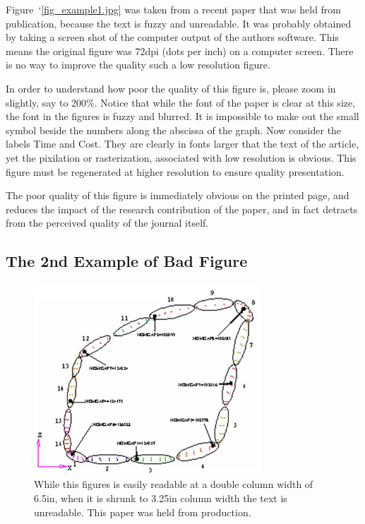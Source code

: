 \documentclass[twocolumn,10pt]{asme2ej}
\begin{document}
Figure~`\ref{fig_example1.jpg}
was taken from a recent paper that was held from publication, because the text is fuzzy and unreadable. It was probably obtained by taking a screen shot of the computer output of the authors software. This means the original figure was 72dpi (dots per inch) on a computer screen. There is no way to improve the quality such a low resolution figure.
 
In order to understand how poor the quality of this figure is, please zoom in slightly, say to 200\%.  Notice that while the font of the paper is clear at this size, the font in the figures is fuzzy and blurred.  It is impossible to make out the small symbol beside the numbers along the abscissa of the graph.  Now consider the labels Time and Cost. They are clearly in fonts larger that the text of the article, yet the pixilation or rasterization, associated with low resolution is obvious. This figure must be regenerated at higher resolution to ensure quality presentation.

The poor quality of this figure is immediately obvious on the printed page, and reduces the impact of the research contribution of the paper, and in fact detracts from the perceived quality of the journal itself.



\subsection{The 2nd Example of Bad Figure}

\begin{figure} 
\centerline{\includegraphics[width=3.34in]{figure/FMANU_MD_05_1272_5.jpg}}
\caption{While this figures is easily readable at a double column width of 6.5in, when it is shrunk to 3.25in column width the text is unreadable. This paper was held from production.}
\label{fig_example2.jpg}
\end{figure}
\end{document}
